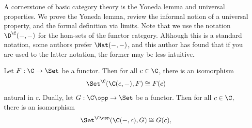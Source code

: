 A cornerstone of basic category theory is the Yoneda lemma and universal properties. We prove the Yoneda lemma, review the informal notion of a universal property, and the formal definition via limits. Note that we use the notation $\D^\C(-,-)$ for the hom-sets of the functor category. Although this is a standard notation, some authors prefer $\Nat(-,-)$, and this author has found that if you are used to the latter notation, the former may be less intuitive.

\begin{lemma}[Yoneda]\label{A.2.1}
    Let $F : \C \to\Set$ be a functor. Then for all $c\in\C$, there is an isomorphism
    \[
    \Set^\C(\C(c,-),F)\cong F(c)
    \]
    natural in $c$. Dually, let $G : \C\opp\to\Set$ be a functor. Then for all $c\in\C$, there is an isomorphism
    \[
    \Set^{\C\opp}(\C(-,c),G)\cong G(c),
    \]
\end{lemma}
